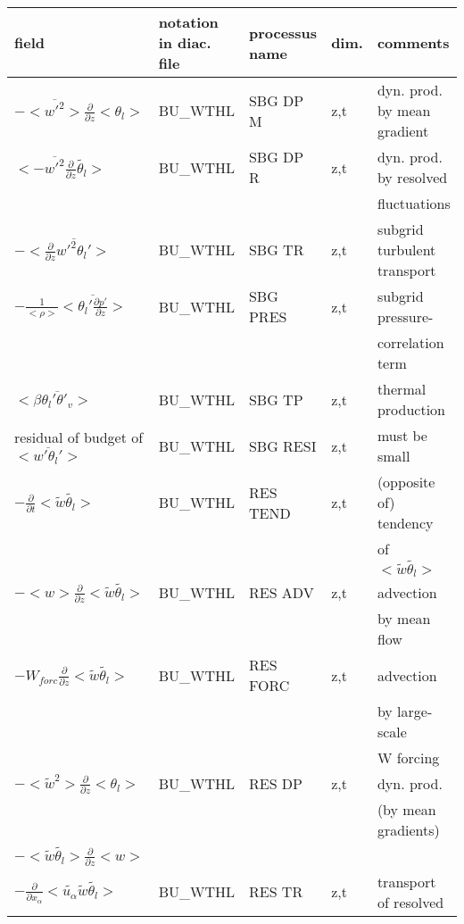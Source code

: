 \begin{center}
\begin{tabular}{||p{5cm}|>{\centering}p{2cm}|>{\centering}p{2.5cm}|>{\centering}p{0.5cm}|p{5.5cm }||}
\hline
\hline
field & notation in diac. file & processus name& dim.  & comments \\
\hline
\hline
$-<\overline{w'^2}>\frac{\partial }{\partial z}<\theta_l>$ & BU\_WTHL & SBG DP M & z,t & dyn. prod. by mean gradient \\
\hline
$<-\overline{w'^2}\frac{\partial}{\partial z}\tilde{\theta_l}>$ & BU\_WTHL & SBG DP R & z,t & dyn. prod. by resolved\\
 & & & & fluctuations\\
\hline
$-<\frac{\partial}{\partial z}\overline{w'^2\theta_l'}>$ & BU\_WTHL & SBG TR   & z,t & subgrid turbulent transport\\
\hline
$- \frac{1}{<\rho>}<\overline{\theta_l' \frac{\partial p'}{\partial z}}>$&
BU\_WTHL & SBG PRES & z,t & subgrid pressure-\\
 & & & &correlation term \\
\hline
$<\beta  \overline{\theta_l'\theta'_v}>$ & BU\_WTHL & SBG TP   & z,t & thermal production \\
\hline
{\rm residual of budget of} $<\overline{w'\theta_l'}>$ & BU\_WTHL & SBG RESI & z,t & must be small \\
\hline
$-\frac{\partial }{\partial t}<\tilde{w}\tilde{\theta_l}>$ & BU\_WTHL & RES TEND & z,t & (opposite of) tendency\\
 & & & &of $<\tilde{w}\tilde{\theta_l}>$\\
\hline
$-<w>\frac{\partial}{\partial z}<\tilde{w}\tilde{\theta_l}>$ & BU\_WTHL & RES ADV  & z,t & advection \\
 & & & & by mean flow\\
\hline
$-W_{forc}\frac{\partial}{\partial z}<\tilde{w}\tilde{\theta_l}>$ & BU\_WTHL & RES FORC & z,t & advection \\
 & & & & by large-scale\\
 & & & & W forcing\\
\hline
$-<\tilde{w}^2>\frac{\partial }{\partial z}<\theta_l>$ & BU\_WTHL & RES DP   & z,t & dyn. prod.\\
 & & & &(by mean gradients) \\
$-<\tilde{w}\tilde{\theta_l}>\frac{\partial }{\partial z}<w>$ &  &  & & \\
\hline
$-\frac{\partial}{\partial x_\alpha} <\tilde{u_\alpha} \tilde{w}\tilde{\theta_l}>$ & BU\_WTHL & RES TR   & z,t & transport of resolved \\

\end{tabular}
\end{center}
